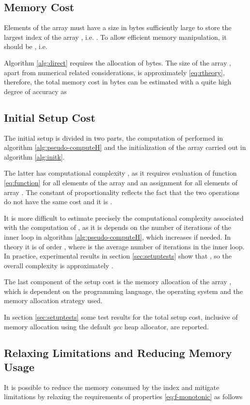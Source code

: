 \documentclass[preprint,1p,times]{elsarticle}
\begin{document}
\subsection{Memory Cost}
\label{sec:memory}
Elements of the array  must have a size  in bytes sufficiently large to store the largest index of the array , i.e. . To allow efficient memory manipulation, it should be , i.e.

Algorithm \ref{alg:direct} requires the allocation of  bytes. The size  of the array , apart from numerical related considerations, is approximately \eqref{eq:rtheory}, therefore, the total memory cost in bytes can be estimated with a quite high degree of accuracy as


\subsection{Initial Setup Cost}
\label{sec:setupcost}
The initial setup is divided in two parts, the computation of  performed in algorithm \eqref{alg:pseudo-computeH} and the initialization of the array  carried out in algorithm \eqref{alg:initk}.

The latter has computational complexity , as it requires evaluation of function \eqref{eq:function} for all elements of the array  and an assignment for all elements of array . The constant of proportionality  reflects the fact that the two operations do not have the same cost and it is .

It is more difficult to estimate precisely the computational complexity associated with the computation of , as it is depends on the number of iterations of the inner loop in algorithm \eqref{alg:pseudo-computeH}, which increases  if needed. In theory it is of order , where  is the average number of iterations in the inner loop. In practice, experimental results in section \eqref{sec:setuptests} show that , so the overall complexity is approximately .

The last component of the setup cost is the memory allocation of the array , which is dependent on the programming language, the operating system and the memory allocation strategy used.

In section \eqref{sec:setuptests} some test results for the total setup cost, inclusive of memory allocation using the default \textit{gcc} heap allocator, are reported.
 
\subsection{Relaxing Limitations and Reducing Memory Usage}
\label{sec:bucketpairs}
It is possible to reduce the memory consumed by the index and mitigate limitations by relaxing the requirements of properties \eqref{eq:f-monotonic} as follows
\end{document}
